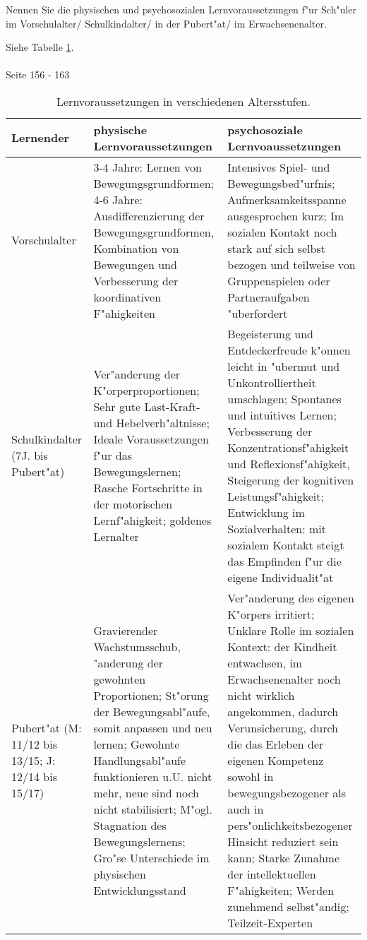 \begin{question}{6}
Nennen Sie die physischen und psychosozialen Lernvoraussetzungen f"ur Sch"uler im Vorschulalter/ Schulkindalter/ in der Pubert"at/ im Erwachsenenalter.
\end{question}
\begin{solution}
Siehe Tabelle \ref{learning}.\\\\
 Seite 156 - 163
\begin{table}
\caption{Lernvoraussetzungen in verschiedenen Altersstufen.}
  \label{learning}
  \scriptsize
  \begin{center}
    \begin{tabular}{p{}|p{}|p{}}
      \textbf{Lernender} & \textbf{physische Lernvoraussetzungen} & \textbf{psychosoziale Lernvoaussetzungen}\\
    \hline
      Vorschulalter & 3-4 Jahre: Lernen von Bewegungsgrundformen; 4-6 Jahre: Ausdifferenzierung der Bewegungsgrundformen, Kombination von Bewegungen und Verbesserung der koordinativen F"ahigkeiten & Intensives Spiel- und Bewegungsbed"urfnis; Aufmerksamkeitsspanne ausgesprochen kurz; Im sozialen Kontakt noch stark auf sich selbst bezogen und teilweise von Gruppenspielen oder Partneraufgaben "uberfordert\\
      Schulkindalter (7J. bis Pubert"at) & Ver"anderung der K"orperproportionen; Sehr gute Last-Kraft- und Hebelverh"altnisse; Ideale Voraussetzungen f"ur das Bewegungslernen; Rasche Fortschritte in der motorischen Lernf"ahigkeit; goldenes Lernalter & Begeisterung und Entdeckerfreude k"onnen leicht in "ubermut und Unkontrolliertheit umschlagen; Spontanes und intuitives Lernen; Verbesserung der Konzentrationsf"ahigkeit und Reflexionsf"ahigkeit, Steigerung der kognitiven Leistungsf"ahigkeit; Entwicklung im Sozialverhalten: mit
sozialem Kontakt steigt das Empfinden f"ur die eigene Individualit"at\\
Pubert"at (M: 11/12 bis 13/15; J: 12/14 bis 15/17) & Gravierender Wachstumsschub, "anderung der gewohnten Proportionen; St"orung der Bewegungsabl"aufe, somit anpassen und neu lernen; Gewohnte Handlungsabl"aufe funktionieren u.U. nicht mehr, neue sind noch nicht stabilisiert; M"ogl. Stagnation des Bewegungslernens; Gro"se Unterschiede im physischen Entwicklungsstand & Ver"anderung des eigenen K"orpers irritiert; Unklare Rolle im sozialen Kontext: der Kindheit entwachsen, im Erwachsenenalter noch nicht wirklich angekommen, dadurch Verunsicherung, durch die das Erleben der eigenen Kompetenz sowohl in bewegungsbezogener als auch in pers"onlichkeitsbezogener Hinsicht reduziert sein kann; Starke Zunahme der intellektuellen F"ahigkeiten; Werden zunehmend selbst"andig; Teilzeit-Experten\\

\end{tabular}
\end{center}
\end{table}
\end{solution}

